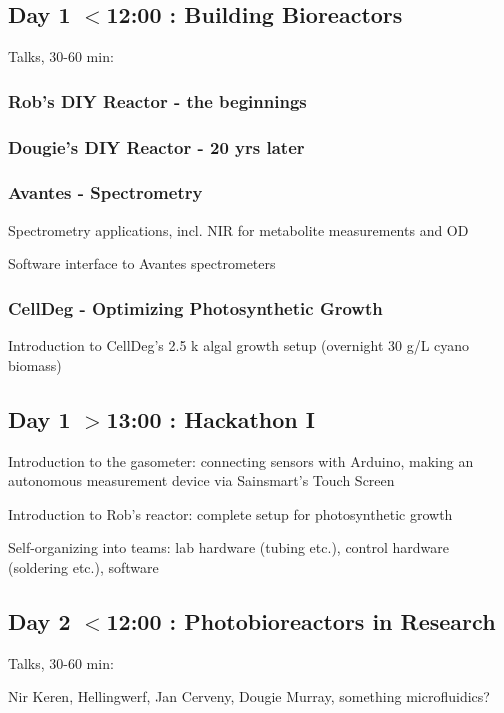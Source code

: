 \documentclass[12pt,a4paper]{article}
\begin{document}
\subsection{Day 1 $<$12:00 : Building Bioreactors}

Talks, 30-60 min:

\subsubsection{Rob's DIY Reactor - the beginnings}
\subsubsection{Dougie's DIY Reactor - 20 yrs later}
\subsubsection{Avantes - Spectrometry}

Spectrometry applications, incl. NIR for metabolite measurements and OD

Software interface to Avantes spectrometers

\subsubsection{CellDeg - Optimizing Photosynthetic Growth}

Introduction to CellDeg's 2.5 k algal growth setup (overnight 30 g/L
cyano biomass)

\subsection{Day 1 $>$13:00 : Hackathon I}

Introduction to the gasometer: connecting sensors with Arduino,
making an autonomous measurement device via Sainsmart's Touch Screen

Introduction to Rob's reactor: complete setup for photosynthetic growth

Self-organizing into teams: lab hardware (tubing etc.), control hardware
(soldering etc.), software

\subsection{Day 2 $<$12:00 : Photobioreactors in Research}

Talks, 30-60 min:

Nir Keren, Hellingwerf, Jan Cerveny, Dougie Murray,
something microfluidics?
\end{document}
